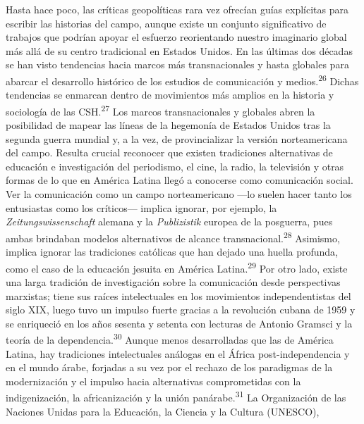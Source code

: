 \documentclass{tufte-handout}
\begin{document}
Hasta hace poco, las críticas geopolíticas rara vez ofrecían guías
explícitas para escribir las historias del campo, aunque existe un
conjunto significativo de trabajos que podrían apoyar el esfuerzo
reorientando nuestro imaginario global más allá de su centro tradicional
en Estados Unidos. En las últimas dos décadas se han visto tendencias
hacia marcos más transnacionales y hasta globales para abarcar el
desarrollo histórico de los estudios de comunicación y
medios.\textsuperscript{26} Dichas tendencias se enmarcan dentro de movimientos
más amplios en la historia y sociología de las CSH.\textsuperscript{27} Los marcos transnacionales y globales
abren la posibilidad de mapear las líneas de la hegemonía de Estados
Unidos tras la segunda guerra mundial y, a la vez, de provincializar la
versión norteamericana del campo. Resulta crucial reconocer que existen
tradiciones alternativas de educación e investigación del periodismo, el
cine, la radio, la televisión y otras formas de lo que en América Latina
llegó a conocerse como comunicación social. Ver la comunicación como un
campo norteamericano ---lo suelen hacer tanto los entusiastas como los
críticos--- implica ignorar, por ejemplo, la \emph{Zeitungswissenschaft}
alemana y la \emph{Publizistik} europea de la posguerra, pues ambas
brindaban modelos alternativos de alcance transnacional.\textsuperscript{28} Asimismo, implica ignorar las tradiciones católicas que
han dejado una huella profunda, como el caso de la educación jesuita en
América Latina.\textsuperscript{29} Por otro lado, existe una larga tradición de
investigación sobre la comunicación desde perspectivas marxistas; tiene
sus raíces intelectuales en los movimientos independentistas del siglo
XIX, luego tuvo un impulso fuerte gracias a la revolución cubana de 1959
y se enriqueció en los años sesenta y setenta con lecturas de Antonio
Gramsci y la teoría de la dependencia.\textsuperscript{30}
Aunque menos desarrolladas que las de América Latina, hay tradiciones
intelectuales análogas en el África post-independencia y en el mundo
árabe, forjadas a su vez por el rechazo de los paradigmas de la
modernización y el impulso hacia alternativas comprometidas con la
indigenización, la africanización y la unión panárabe.\textsuperscript{31} La Organización de
las Naciones Unidas para la Educación, la Ciencia y la Cultura (UNESCO),
\end{document}

